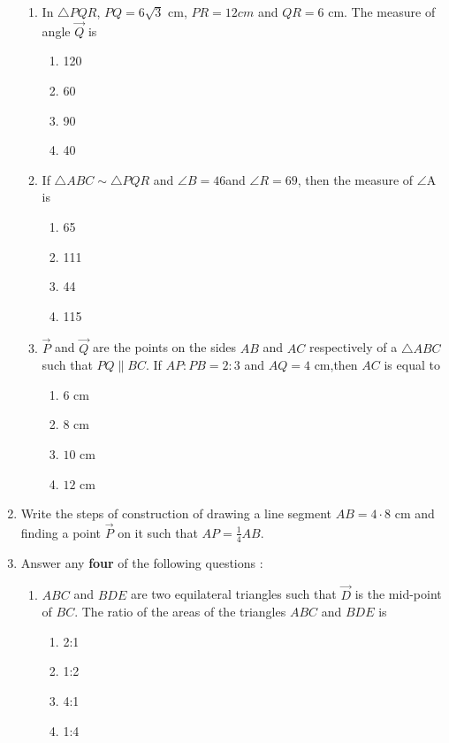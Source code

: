 \begin{enumerate}
\begin{enumerate}[label=(\roman*)]
        \item In $\triangle PQR$, $PQ=6\sqrt{3}$ cm, $PR=12 cm$ and $QR = 6$ cm. The measure of angle $\vec{Q}$ is
        
        \begin{enumerate}[label=(\Alph*)]
            \item 120\textdegree
            \item 60\textdegree
            \item 90\textdegree
            \item 40\textdegree
        \end{enumerate}
        
        \item If $\triangle ABC\sim\triangle PQR$ and $\angle B=46$\textdegree and $\angle R=69$\textdegree, then the measure of $\angle$A is
        
        \begin{enumerate}[label=(\Alph*)]
            \item 65\textdegree
            \item 111\textdegree
            \item 44\textdegree
            \item 115\textdegree
        \end{enumerate}
        
        \item $\vec{P}$ and $\vec{Q}$ are the points on the sides $AB$ and $AC$ respectively of a $\triangle ABC$ such that $PQ\parallel BC$. If $AP:PB=2:3$ and $AQ=4$ cm,then $AC$ is equal to

        \begin{enumerate}[label=(\Alph*)]
            \item $6$ cm
            \item $8$ cm
            \item $10$ cm
            \item $12$ cm
        \end{enumerate}
        \end{enumerate}
        \item Write the steps of construction of drawing a line segment $AB=4\cdot8$ cm and finding a point $\vec{P}$ on it such that $AP=\frac{1}{4}AB$.
        
        \item Answer any \textbf{four} of the following questions :
        \begin{enumerate}[label=(\roman*)]
        \item $ABC$ and $BDE$ are two equilateral triangles such that $\vec{D}$ is the mid-point of $BC$. The ratio of the areas of the triangles $ABC$ and $BDE$ is
        \begin{enumerate}[label=(\Alph*)]
            \item 2:1
            \item 1:2
            \item 4:1
            \item 1:4
        \end{enumerate}
        

\end{enumerate}
\end{enumerate}
